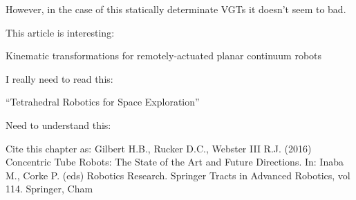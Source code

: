 \documentclass[11pt]{article}
\begin{document}
However, in the case of this statically determinate VGTs it doesn't seem to bad.

This article is interesting:

Kinematic transformations for remotely-actuated planar continuum robots

I really need to read this:

``Tetrahedral Robotics for Space Exploration''

Need to understand this:

Cite this chapter as:
Gilbert H.B., Rucker D.C., Webster III R.J. (2016) Concentric Tube Robots: The State of the Art and Future Directions. In: Inaba M., Corke P. (eds) Robotics Research. Springer Tracts in Advanced Robotics, vol 114. Springer, Cham





\end{document}
